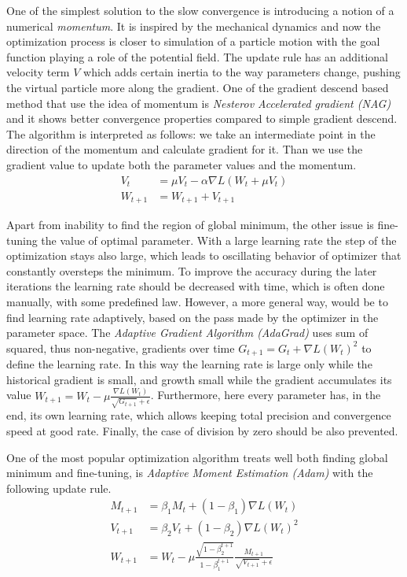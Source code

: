 One of the simplest solution to the slow convergence is introducing a notion of a numerical \emph{momentum}.
It is inspired by the mechanical dynamics and now the optimization process is closer to simulation of a particle motion with the goal function playing a role of the potential field.
The update rule has an additional velocity term $V$ which adds certain inertia to the way parameters change, pushing the virtual particle more along the gradient. 
One of the gradient descend based method that use the idea of momentum is \emph{Nesterov Accelerated gradient (NAG)} and it shows better convergence properties compared to simple gradient descend.
The algorithm is interpreted as follows: 
we take an intermediate point in the direction of the momentum and calculate gradient for it.
Than we use the gradient value to update both the parameter values and the momentum.
\begin{align*}
	V_{t} & =\mu V_{t} - \alpha \nabla L (W_{t}+\mu V_{t}) \\
	W_{t+1} & = W_{t+1} + V_{t+1}
\end{align*}

Apart from inability to find the region of global minimum, the other issue is fine-tuning the value of optimal parameter.
With a large learning rate the step of the optimization stays also large, which leads to oscillating behavior of optimizer that constantly oversteps the minimum.
To improve the accuracy during the later iterations the learning rate should be decreased with time, which is often done manually, with some predefined law. 
However, a more general way, would be to find learning rate adaptively, based on the pass made by the optimizer in the parameter space.
The \textit{Adaptive Gradient Algorithm (AdaGrad)} uses sum of squared, thus non-negative, gradients over time $G_{t+1} = G_{t}+\nabla L(W_{t})^2$ to define the learning rate.
In this way the learning rate is large only while the historical gradient is small, and growth small while the gradient accumulates its value $ W_{t+1} = W_{t} -\mu \frac{\nabla L(W_{t})}{\sqrt{G_{t+1}}+\epsilon} $.
Furthermore, here every parameter has, in the end, its own learning rate, which allows keeping total precision and convergence speed at good rate.
Finally, the case of division by zero should be also prevented. 
\medskip

One of the most popular optimization algorithm treats well both finding global minimum and fine-tuning, is \emph{Adaptive Moment Estimation (Adam)} with the following update rule.
\begin{align*}
	M_{t+1} & = \beta_{1}M_{t} + (1-\beta_{1})\nabla L(W_{t}) \\
	V_{t+1} & = \beta_{2} V_{t} + (1-\beta_{2})\nabla L(W_{t})^2 \\
	W_{t+1} & = W_{t} - \mu \frac{\sqrt{1-\beta_{2}^{t+1}}}{1-\beta_{1}^{t+1}} \frac{M_{t+1}}{\sqrt{V_{t+1}}+\epsilon}
\end{align*}		

